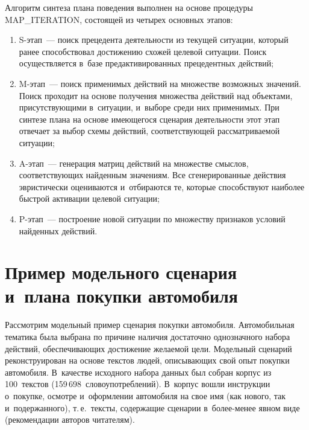 \begin{multicols}{2}
  Алгоритм синтеза плана поведения выполнен на основе процедуры MAP\_ITERATION, со\-сто\-ящей из 
четырех основных этапов:
  \begin{enumerate}[(1)]
\item S-этап~--- поиск прецедента деятельности из текущей ситуации, 
который ранее способствовал достижению схожей целевой ситуации. Поиск 
осуществляется в~базе предактивированных прецедентных действий;
\item M-этап~--- поиск применимых действий на множестве воз\-мож\-ных 
значений. Поиск проходит на основе получения множества действий над 
объектами, присутствующими в~ситуации, и~выборе среди них применимых. 
При синтезе плана на основе име\-юще\-го\-ся сценария деятельности этот этап 
отвечает за выбор схемы действий, со\-от\-вет\-ст\-ву\-ющей рас\-смат\-ри\-ва\-емой 
ситуации;
\item A-этап~--- генерация мат\-риц действий на множестве смыс\-лов, 
со\-от\-вет\-ст\-ву\-ющих найденным значениям. Все сгенерированные действия 
эвристически оцениваются и~отбираются те, которые способствуют 
наиболее быст\-рой активации целевой ситуации;
\item P-этап~--- построение новой ситуации по множеству признаков 
условий найденных действий.
\end{enumerate}

\section{Пример модельного сценария и~плана покупки 
автомобиля}

\vspace*{-3pt}

  Рассмотрим модельный пример сценария покупки автомобиля. 
Автомобильная тематика была выбрана по причине наличия \mbox{достаточно} 
однозначного набора действий, обес\-пе\-чи\-ва\-ющих \mbox{достижение} же\-ла\-емой цели. 
Модельный сценарий реконструирован на основе текс\-тов людей, опи\-сы\-ва\-ющих 
свой опыт покупки автомобиля. В~качестве исходного набора данных был 
собран корпус из 100~текс\-тов (159\,698~словоупотреблений). В~корпус во\-шли 
инструкции о~покупке, осмотре и~оформ\-ле\-нии автомобиля на свое имя (как 
нового, так и~подержанного), т.\,е.\ текс\-ты, содержащие сценарии в~более-менее 
явном виде (рекомендации авторов читателям). 
  

\end{multicols}
